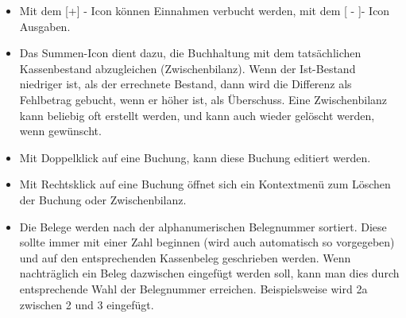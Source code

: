 \begin{itemize}
 	\item Mit dem [+] - Icon können Einnahmen verbucht werden, mit dem [ - ]-  Icon Ausgaben.
	\item Das Summen-Icon dient dazu, die Buchhaltung mit dem tatsächlichen Kassenbestand abzugleichen (Zwischenbilanz). Wenn der Ist-Bestand niedriger ist, als der errechnete Bestand, dann wird die Differenz als Fehlbetrag gebucht, wenn er höher ist, als Überschuss. Eine Zwischenbilanz kann beliebig oft erstellt werden, und kann auch wieder gelöscht werden, wenn gewünscht.

	\item Mit Doppelklick auf eine Buchung, kann diese Buchung editiert werden.

	\item Mit Rechtsklick auf eine Buchung öffnet sich ein Kontextmenü zum Löschen der Buchung oder Zwischenbilanz.

	\item Die Belege werden nach der alphanumerischen Belegnummer sortiert. Diese sollte immer mit einer Zahl beginnen (wird auch automatisch so vorgegeben) und auf den entsprechenden Kassenbeleg geschrieben werden. Wenn nachträglich ein Beleg dazwischen eingefügt werden soll, kann man dies durch entsprechende Wahl der Belegnummer erreichen. Beispielsweise wird 2a zwischen 2 und 3 eingefügt.
\end{itemize}


